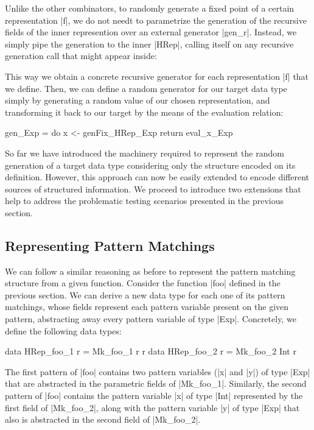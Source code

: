 Unlike the other combinators, to randomly generate a fixed point of a certain
representation |f|, we do not needt to parametrize the generation of the
recursive fields of the inner represention over an external generator |gen_r|.
%
Instead, we simply pipe the generation to the inner |HRep|, calling itself on
any recursive generation call that might appear inside:


This way we obtain a concrete recursive generator for each representation |f|
that we define.
%
Then, we can define a random generator for our target data type simply by
generating a random value of our chosen representation, and transforming it back
to our target by the means of the evaluation relation:

\begin{code}
  gen_Exp = do  x <- genFix_HRep_Exp
                return eval_x_Exp
\end{code} %


So far we have introduced the machinery required to represent the random
generation of a target data type considering only the structure encoded on its
definition.
%
However, this approach can now be easily extended to encode different sources of
structured information.
%
We proceed to introduce two extensions that help to address the problematic
testing scenarios presented in the previous section.


\subsection*{\textbf{Representing Pattern Matchings}}

We can follow a similar reasoning as before to represent the pattern matching
structure from a given function.
%
Consider the function |foo| defined in the previous section.
%
We can derive a new data type for each one of its pattern matchings, whose
fields represent each pattern variable present on the given pattern, abstracting
away every pattern variable of type |Exp|.
%
Concretely, we define the following data types:

\begin{code}
data HRep_foo_1  r = Mk_foo_1 r r
data HRep_foo_2  r = Mk_foo_2 Int r
\end{code}

The first pattern of |foo| contains two pattern variables (|x| and |y|) of type
|Exp| that are abstracted in the parametric fields of |Mk_foo_1|.
%
Similarly, the second pattern of |foo| contains the pattern variable |x| of type
|Int| represented by the first field of |Mk_foo_2|, along with the pattern
variable |y| of type |Exp| that also is abstracted in the second field of
|Mk_foo_2|.

